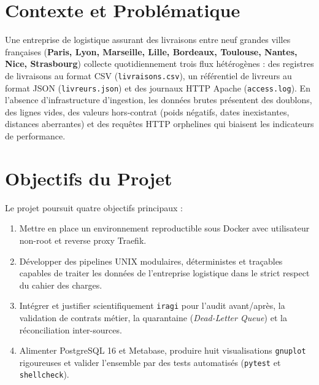 \documentclass[11pt,a4paper]{article}
\begin{document}
\section{Contexte et Probl\'ematique}
Une entreprise de logistique assurant des livraisons entre neuf grandes villes fran\c{c}aises (\textbf{Paris, Lyon, Marseille, Lille, Bordeaux, Toulouse, Nantes, Nice, Strasbourg}) collecte quotidiennement trois flux h\'et\'erog\`enes : des registres de livraisons au format CSV (\texttt{livraisons.csv}), un r\'ef\'erentiel de livreurs au format JSON (\texttt{livreurs.json}) et des journaux HTTP Apache (\texttt{access.log}). En l'absence d'infrastructure d'ingestion, les donn\'ees brutes pr\'esentent des doublons, des lignes vides, des valeurs hors-contrat (poids n\'egatifs, dates inexistantes, distances aberrantes) et des requ\^etes HTTP orphelines qui biaisent les indicateurs de performance.

\section{Objectifs du Projet}
Le projet poursuit quatre objectifs principaux :
\begin{enumerate}
    \item Mettre en place un environnement reproductible sous Docker avec utilisateur non-root et reverse proxy Traefik.
    \item D\'evelopper des pipelines UNIX modulaires, d\'eterministes et tra\c{c}ables capables de traiter les donn\'ees de l'entreprise logistique dans le strict respect du cahier des charges.
    \item Int\'egrer et justifier scientifiquement \texttt{iragi} pour l'audit avant/apr\`es, la validation de contrats m\'etier, la quarantaine (\emph{Dead-Letter Queue}) et la r\'econciliation inter-sources.
    \item Alimenter PostgreSQL 16 et Metabase, produire huit visualisations \texttt{gnuplot} rigoureuses et valider l'ensemble par des tests automatis\'es (\texttt{pytest} et \texttt{shellcheck}).
\end{enumerate}

\end{document}

